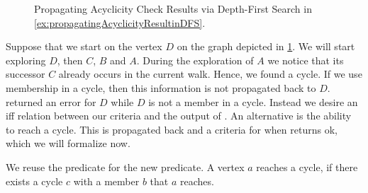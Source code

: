 \begin{figure}
  \center
  \caption{Propagating Acyclicity Check Results via Depth-First Search in \cref{ex:propagatingAcyclicityResultinDFS}.}\label{fig:propagatingAcyclicityResultinDFS}
\end{figure}

\begin{example}
  \label{ex:propagatingAcyclicityResultinDFS}
  

  Suppose that we start \dfsstep on the vertex $D$ on the graph depicted in \cref{fig:propagatingAcyclicityResultinDFS}. We will start exploring $D$, then $C$, $B$ and $A$. During the exploration of $A$ we notice that its successor $C$ already occurs in the current walk. Hence, we found a cycle. If we use membership in a cycle, then this information is not propagated back to $D$. \dfsstep returned an error for $D$ while $D$ is not a member in a cycle. Instead we desire an iff relation between our criteria and the output of \dfsstep. An alternative is the ability to reach a cycle. This is propagated back and a criteria for when \dfsstep returns ok, which we will formalize now.
\end{example}

We reuse the \canReach predicate for the new \reachesCycle predicate. A vertex $a$ reaches a cycle, if there exists a cycle $c$ with a member $b$ that $a$ reaches.

